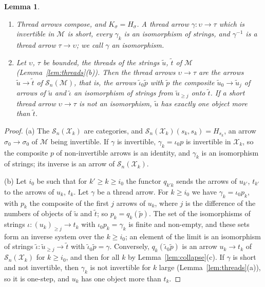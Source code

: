 \documentclass[11pt]{amsart}
\newtheorem{lem}[thm]{Lemma}
\theoremstyle{definition}
\newcommand{\cX}{\mathcal X}
\newcommand{\cM}{\mathcal M}
\newcommand{\cS}{\mathcal S}
\begin{document}
\begin{lem}\label{lem:tarrows}
\begin{enumerate}
\item[(a)] Thread arrows compose, and $K_\sigma=H_\sigma$. A thread
arrow $\gamma\colon\upsilon\to\tau$ which is invertible in $\cM$ is
short, every $\gamma_k$ is an isomorphism of strings, and
$\gamma^{-1}$ is a thread arrow $\tau\to\upsilon$; we call $\gamma$
an \emph{isomorphism}.
\item[(b)] Let $\upsilon$, $\tau$ be bounded, the threads of the
strings $\tilde u$, $\tilde t$ of $\cM$
\textup{(Lemma~\ref{lem:threads}(b))}. Then the thread arrows
$\upsilon\to\tau$ are the arrows $\tilde u\to\tilde t$ of
$\cS_n(\cM)$, that is, the arrows $\tilde\iota_0\tilde p$ with
$\tilde p$ the composite $\tilde u_0\to\tilde u_j$ of arrows of
$\tilde u$ and $\tilde\iota$ an isomorphism of strings from $\tilde
u_{\ge j}$ onto $\tilde t$. If a short thread arrow $\upsilon\to\tau$
is not an isomorphism, $\tilde u$ has exactly one object more than
$\tilde t$.
\end{enumerate}
\end{lem}
\begin{proof}
(a) The $\cS_n(\cX_k)$ are categories, and $\cS_n(\cX_k)(s_k,s_k)=
H_{s_k}$, an arrow $\sigma_0\to\sigma_0$ of $\cM$ being invertible.
If $\gamma$ is invertible, $\gamma_k=\iota_0p$ is invertible in
$\cX_k$, so the composite $p$ of non-invertible arrows is an
identity, and $\gamma_k$ is an isomorphism of strings; its inverse is
an arrow of $\cS_n(\cX_k)$.

(b) Let $i_0$ be such that for $k'\ge k\ge i_0$ the functor $q_{k'k}$
sends the arrows of $u_{k'}$, $t_{k'}$ to the arrows of $u_k$, $t_k$.
Let $\gamma$ be a thread arrow. For $k\ge i_0$ we have
$\gamma_k=\iota_0p_k$, with $p_k$ the composite of the first $j$
arrows of $u_k$, where $j$ is the difference of the numbers of
objects of $\tilde u$ and $\tilde t$; so $p_k=q_k(\tilde p)$. The set
of the isomorphisms of strings $\iota\colon(u_k)_{\ge j}\to t_k$ with
$\iota_0p_k=\gamma_k$ is finite and non-empty, and these sets form an
inverse system over the $k\ge i_0$; an element of the limit is an
isomorphism of strings $\tilde\iota\colon\tilde u_{\ge j}\to\tilde t$
with $\tilde\iota_0\tilde p=\gamma$. Conversely, $q_k(\tilde\iota_0
\tilde p)$ is an arrow $u_k\to t_k$ of $\cS_n(\cX_k)$ for $k\ge i_0$,
and then for all $k$ by Lemma~\ref{lem:collapse}(c). If $\gamma$ is
short and not invertible, then $\gamma_k$ is not invertible for $k$
large (Lemma~\ref{lem:threads}(a)), so it is one-step, and $u_k$ has
one object more than $t_k$.
\end{proof}
\end{document}

